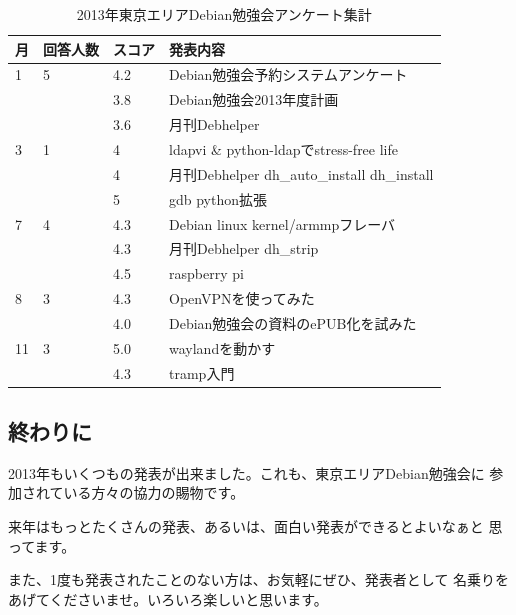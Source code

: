 \documentclass[mingoth,a4paper]{jsarticle}
\begin{document}
\begin{table}[ht]
\begin{center}
\begin{tabular}{|l|l|l|p{10cm}|}
\hline 
月&回答人数&スコア&発表内容 \\ \hline \hline
1 & 5 & 4.2 & Debian勉強会予約システムアンケート \\ \cline{3-4}
  &   & 3.8 & Debian勉強会2013年度計画 \\ \cline{3-4}
  &   & 3.6 & 月刊Debhelper \\ \hline
3 & 1 & 4 & ldapvi \& python-ldapでstress-free life \\ \cline{3-4}
  &   & 4 & 月刊Debhelper dh\_auto\_install dh\_install \\ \cline{3-4}
  &   & 5 & gdb python拡張 \\ \hline
7 & 4 & 4.3 & Debian linux kernel/armmpフレーバ \\ \cline{3-4}
  &   & 4.3 & 月刊Debhelper dh\_strip \\ \cline{3-4}
  &   & 4.5 & raspberry pi \\ \hline
8 & 3 & 4.3 & OpenVPNを使ってみた \\ \cline{3-4}
  &   & 4.0 & Debian勉強会の資料のePUB化を試みた \\ \hline
11& 3 & 5.0 & waylandを動かす \\ \cline{3-4}
  &   & 4.3 & tramp入門 \\ \hline
\end{tabular}
\label{tab:debian-meeting-summary}
\caption{2013年東京エリアDebian勉強会アンケート集計}
\end{center}
\end{table}

\subsection{終わりに}

 2013年もいくつもの発表が出来ました。これも、東京エリアDebian勉強会に
参加されている方々の協力の賜物です。

 来年はもっとたくさんの発表、あるいは、面白い発表ができるとよいなぁと
思ってます。

 また、1度も発表されたことのない方は、お気軽にぜひ、発表者として
名乗りをあげてくださいませ。いろいろ楽しいと思います。


\end{document}
